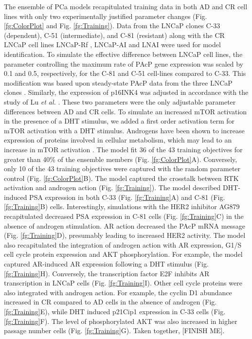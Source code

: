 \documentclass[12pt]{article}
\begin{document}
The ensemble of PCa models recapitulated training data in both AD and CR cell lines with only two experimentally justified parameter changes (Fig. \ref{fg:ColorPlot} and Fig. \ref{fg:Training}). 
Data from the LNCaP clones C-33 (dependent), C-51 (intermediate), and C-81 (resistant) \cite{Lin2000,Igawa2002,Horoszewicz1983} along with the CR LNCaP cell lines LNCaP-Rf \cite{Murillo2001}, LNCaP-AI \cite{Chen2011} and LNAI \cite{Graff2009} were used for model identification. 
To simulate the effective difference between LNCaP cell lines, the parameter controlling the maximum rate of PAcP gene expression was scaled by 0.1 and 0.5, respectively, for the C-81 and C-51 cell-lines compared to C-33. 
This modification was based upon steady-state PAcP data from the three LNCaP clones \cite{Lee2003}. 
Similarly, the expression of p16INK4 was adjusted in accordance with the study of Lu \textit{et al.} \citep{Lu1997}. 
These two parameters were the only adjustable parameter differences between AD and CR cells. 
To simulate an increased mTOR activation in the presence of a DHT stimulus, we added a first order activation term for mTOR activation with a DHT stimulus. Androgens have been shown to increase expression of proteins involved in cellular metabolism, which may lead to an increase in mTOR activation \cite{Xu2006}.
The model fit 36 of the 43 training objectives for greater than 40\% of the ensemble members (Fig. \ref{fg:ColorPlot}A). 
Conversely, only 10 of the 43 training objectives were captured with the random parameter control (Fig. \ref{fg:ColorPlot}B). 
The model captured the crosstalk between RTK activation and androgen action (Fig. \ref{fg:Training}). 
The model described DHT-induced PSA expression in both C-33 (Fig. \ref{fg:Training}A) and C-81 (Fig. \ref{fg:Training}B) cells. 
Interestingly, simulations with the HER2 inhibitor AG879 recapitulated decreased PSA expression in C-81 cells (Fig. \ref{fg:Training}C) in the absence of androgen stimulation.
AR action decreased the PAcP mRNA message (Fig. \ref{fg:Training}D), presumably leading to increased HER2 activity. 
The model also recapitulated the integration of androgen action with AR expression, G1/S cell cycle protein expression and AKT phosphorylation. 
For example, the model captured AR-induced AR expression following a DHT stimulus (Fig. \ref{fg:Training}H).
Conversely, the transcription factor E2F inhibits AR transcription in LNCaP cells (Fig. \ref{fg:Training}I). 
Other cell cycle proteins were also integrated with androgen action.
For example, the cyclin D1 abundance increased in CR compared to AD cells in the absence of androgen (Fig. \ref{fg:Training}E), while DHT induced p21Cip1 expression in C-33 cells (Fig. \ref{fg:Training}F).
The level of phosphorylated AKT was also increased in higher passage number cells (Fig. \ref{fg:Training}G). Taken together, [FINISH ME].
\end{document}
